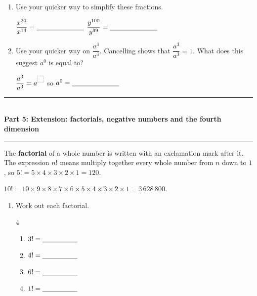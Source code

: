 \documentclass[12pt,a4paper]{article}
\newcommand{\ansline}[1][2.2cm]{\underline{\hspace{#1}}}
\newcommand{\boxgap}[1][9pt]{\tikz[baseline=-0.8pt]\draw[gray!60,densely dotted,thick]
  (0,0) rectangle (#1,#1);}
\newcommand{\heading}[1]{%
  \vspace{2pt}
  {\color{blue!45!black}\rule{\linewidth}{1pt}}\\[1pt]
  {\large\bfseries #1}\\[-6pt]
  {\color{blue!45!black}\rule{\linewidth}{0.4pt}}
  \vspace{2pt}}
\newcommand{\parttitle}[2]{\heading{Part #1: #2}}
\begin{document}
\begin{enumerate}[resume]
\begin{enumerate}
\vspace{6pt}
\ansline[16cm]

\vspace{16pt}
\ansline[16cm]

\vspace{6pt}
  \item Use your quicker way to simplify these fractions.

\vspace{8pt}
$\dfrac{x^{20}}{x^{13}}=\ansline[2.4cm]$ \hspace{3em}
$\dfrac{y^{100}}{y^{99}}=\ansline[2.4cm]$

\vspace{6pt}
  \item Use your quicker way on $\dfrac{a^3}{a^3}$. Cancelling shows that
        $\dfrac{a^3}{a^3}=1$. What does this suggest $a^0$ is equal to?

\vspace{10pt}
$\dfrac{a^3}{a^3}=a^{\boxgap}$ \hspace{3em} so \hspace{3em} $a^0=\ansline[2.4cm]$
\end{enumerate}

\end{enumerate}

\newpage{}

\vspace{6pt}

\parttitle{5}{Extension: factorials, negative numbers and the fourth dimension}

The \textbf{factorial} of a whole number is written with an exclamation mark
after it. The expression $n!$ means multiply together every whole number from
$n$ down to $1$, so $5!=5\times4\times3\times2\times1=120$.

$10!=10\times9\times8\times7\times6\times5\times4\times3\times2\times1=3\,628\,800$.

\begin{enumerate}[resume]

\item Work out each factorial.
\begin{multicols}{4}
\begin{enumerate}
  \item $3!=\ansline[1.8cm]$
  \item $4!=\ansline[1.8cm]$
  \item $6!=\ansline[1.8cm]$
  \item $1!=\ansline[1.8cm]$
\end{enumerate}
\end{multicols}

\end{enumerate}
\end{document}
